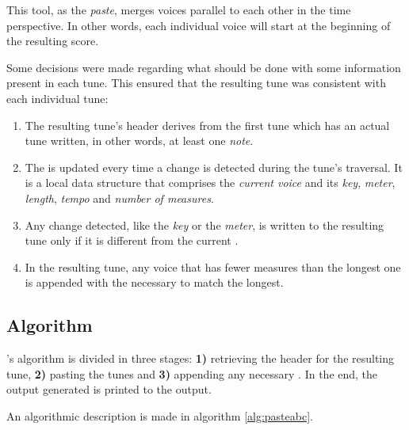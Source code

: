 This tool, as the \unix{} \emph{paste}, merges voices parallel to each other in the time
perspective. In other words, each individual voice will start at the beginning of the resulting
score.

Some decisions were made regarding what should be done with some information present in each tune.
This ensured that the resulting tune was consistent with each individual tune:

\begin{enumerate}
  \item The resulting tune's header derives from the first tune which has an actual tune written, in
  other words, at least one \emph{note}.
  \item The \context{} is updated every time a change is detected during the tune's traversal. It is
  a local data structure that comprises the \emph{current voice} and its \emph{key}, \emph{meter},
  \emph{length}, \emph{tempo} and \emph{number of measures}.
  \item Any \context{} change detected, like the \emph{key} or the \emph{meter}, is written to the
  resulting tune only if it is different from the current \context{}.
  \item In the resulting tune, any voice that has fewer measures than the longest one is appended
  with the necessary \measurerests{} to match the longest.
\end{enumerate}

\subsection*{Algorithm}

\pasteabc{}'s algorithm is divided in three stages: \textbf{1)} retrieving the header for the
resulting tune, \textbf{2)} pasting the tunes and \textbf{3)} appending any necessary
\measurerests{}. In the end, the output generated is printed to the output.

An algorithmic description is made in algorithm \ref{alg:pasteabc}.

